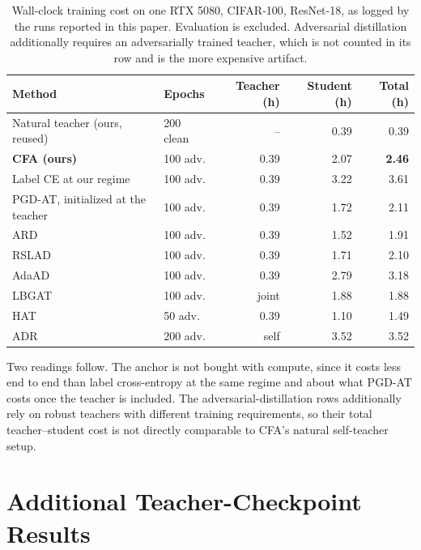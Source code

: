 \begin{table}[!htbp]
  \centering \small \setlength{\tabcolsep}{5pt}
  \caption{Wall-clock training cost on one RTX 5080, CIFAR-100, ResNet-18, as logged by the runs
  reported in this paper. Evaluation is excluded. Adversarial distillation additionally requires an
  adversarially trained teacher, which is not counted in its row and is the more expensive artifact.}
  \label{tab:compute}
  \begin{tabular}{llrrr}
    \toprule
    Method & Epochs & Teacher (h) & Student (h) & Total (h) \\
    \midrule
    Natural teacher (ours, reused) & 200 clean & --   & 0.39 & 0.39 \\
    \midrule
    \textbf{CFA (ours)}            & 100 adv.  & 0.39 & 2.07 & \textbf{2.46} \\
    Label CE at our regime         & 100 adv.  & 0.39 & 3.22 & 3.61 \\
    PGD-AT, initialized at the teacher & 100 adv. & 0.39 & 1.72 & 2.11 \\
    ARD                            & 100 adv.  & 0.39 & 1.52 & 1.91 \\
    RSLAD                          & 100 adv.  & 0.39 & 1.71 & 2.10 \\
    AdaAD                          & 100 adv.  & 0.39 & 2.79 & 3.18 \\
    LBGAT                          & 100 adv.  & joint & 1.88 & 1.88 \\
    HAT                            & 50 adv.   & 0.39 & 1.10 & 1.49 \\
    ADR                            & 200 adv.  & self  & 3.52 & 3.52 \\
    \bottomrule
  \end{tabular}
\end{table}

Two readings follow. The anchor is not bought with compute, since it costs less end to end than label
cross-entropy at the same regime and about what PGD-AT costs once the teacher is included. The adversarial-distillation rows additionally rely on robust teachers with different training
requirements, so their total teacher--student cost is not directly comparable to CFA's natural
self-teacher setup.

\section{Additional Teacher-Checkpoint Results}
\label{app:teachersel}

